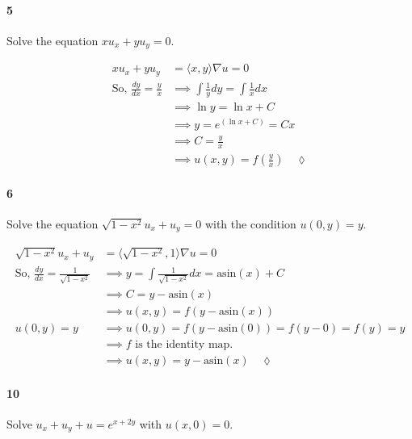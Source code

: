 \documentclass{article}
\begin{document}
\paragraph{5} Solve the equation $xu_x + yu_y = 0$.

\begin{align*}
  xu_x + yu_y &= \langle x,y \rangle\nabla u = 0\\
  \text{So, } \frac{dy}{dx} = \frac{y}{x} &\implies \int \frac{1}{y} dy
                                           = \int \frac{1}{x} dx\\
              &\implies \ln y = \ln x + C\\
              &\implies y = e^{\left(\ln x + C\right)} =
                Cx\\
              &\implies C = \frac{y}{x}\\
              &\implies u(x,y) = f\left(\frac{y}{x}\right)\quad \lozenge
\end{align*}

\paragraph{6} Solve the equation $\sqrt{1 − x^2} u_x + u_y = 0$ with
the condition $u(0, y) = y$.

\begin{align*}
  \sqrt{1 − x^2} u_x + u_y &= \langle \sqrt{1 − x^2},1 \rangle\nabla u
                             = 0\\
  \text{So, } \frac{dy}{dx} = \frac{1}{\sqrt{1-x^2}} &\implies y = \int
                                                \frac{1}{\sqrt{1-x^2}}
                                                       dx =
                                                       \text{asin}(x)+
                                                       C\\
                           &\implies C = y -\text{asin}(x)\\
                           &\implies u(x,y) = f(y-\text{asin}(x))\\
  u(0,y) = y &\implies u(0,y) = f(y-\text{asin}(0)) = f(y - 0) = f(y)
               = y\\
                           &\implies f\text{ is the identity map.}\\
                           &\implies u(x,y) =  y -\text{asin}(x) \quad \lozenge
\end{align*}
\newpage
\paragraph{10} Solve $u_x + u_y + u = e^{x+2y}$ with $u(x, 0) = 0$.
\end{document}
